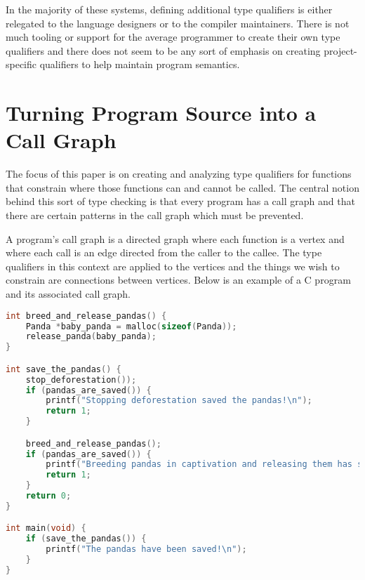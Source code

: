 In the majority of these systems, defining additional type qualifiers is either relegated to the language designers or to the compiler maintainers.  There is not much tooling or support for the average programmer to create their own type qualifiers and there does not seem to be any sort of emphasis on creating project-specific qualifiers to help maintain program semantics.

\section{Turning Program Source into a Call Graph}\label{sec:bac:callgraph}

The focus of this paper is on creating and analyzing type qualifiers for functions that constrain where those functions can and cannot be called.  The central notion behind this sort of type checking is that every program has a call graph and that there are certain patterns in the call graph which must be prevented.  

A program's call graph is a directed graph where each function is a vertex and where each call is an edge directed from the caller to the callee.  The type qualifiers in this context are applied to the vertices and the things we wish to constrain are connections between vertices.  Below is an example of a C program and its associated call graph.

\noindent\begin{minipage}[c]{0.95\textwidth}
\begin{lstlisting}[language=C,caption={Example C program.  The call graph for this program is shown in Figure \ref{fig:pandacallgraph}},label={lst:pandasource}]
int breed_and_release_pandas() {
    Panda *baby_panda = malloc(sizeof(Panda));
    release_panda(baby_panda);
}

int save_the_pandas() {
	stop_deforestation());
	if (pandas_are_saved()) {
		printf("Stopping deforestation saved the pandas!\n");
		return 1;
	}

	breed_and_release_pandas();
	if (pandas_are_saved()) {
		printf("Breeding pandas in captivation and releasing them has saved the pandas!\n");
		return 1;
	}
	return 0;
}

int main(void) {
	if (save_the_pandas()) {
		printf("The pandas have been saved!\n");
	}
}
\end{lstlisting}
\end{minipage}



